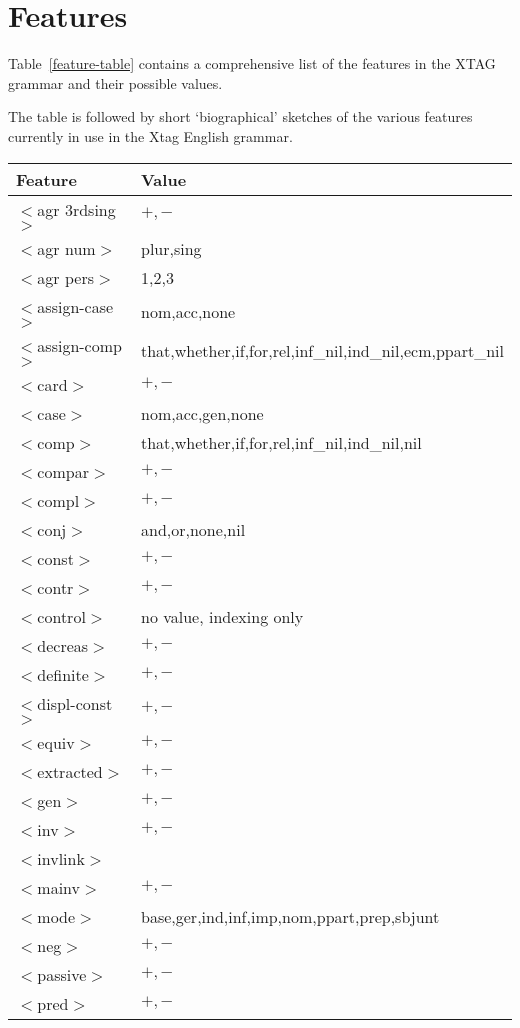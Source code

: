 \chapter{Features}
\label{features}

Table~\ref{feature-table} contains a comprehensive list of the features in the
XTAG grammar and their possible values.

The table is followed by short `biographical' sketches of the various features
currently in use in the Xtag English grammar.

\footnotesize
\begin{table}[hbt]
\centering
\begin{tabular}{|l|l|}
\hline
Feature&Value\\
\hline
\hline
$<$agr 3rdsing$>$&$+,-$\\
$<$agr num$>$&plur,sing\\
$<$agr pers$>$&1,2,3\\
$<$assign-case$>$&nom,acc,none\\
$<$assign-comp$>$&that,whether,if,for,rel,inf\_nil,ind\_nil,ecm,ppart\_nil\\
$<$card$>$&$+,-$\\
$<$case$>$&nom,acc,gen,none\\
$<$comp$>$&that,whether,if,for,rel,inf\_nil,ind\_nil,nil\\
$<$compar$>$&$+,-$\\
$<$compl$>$&$+,-$\\
$<$conj$>$&and,or,none,nil\\
$<$const$>$&$+,-$\\
$<$contr$>$&$+,-$\\
$<$control$>$&no value, indexing only\\
$<$decreas$>$&$+,-$\\
$<$definite$>$&$+,-$\\
$<$displ-const$>$&$+,-$\\
$<$equiv$>$&$+,-$\\
$<$extracted$>$&$+,-$\\
$<$gen$>$&$+,-$\\
$<$inv$>$&$+,-$\\
$<$invlink$>$&\\
$<$mainv$>$&$+,-$\\
$<$mode$>$&base,ger,ind,inf,imp,nom,ppart,prep,sbjunt\\
$<$neg$>$&$+,-$\\
$<$passive$>$&$+,-$\\
$<$pred$>$&$+,-$\\

\end{tabular}
\end{table}

